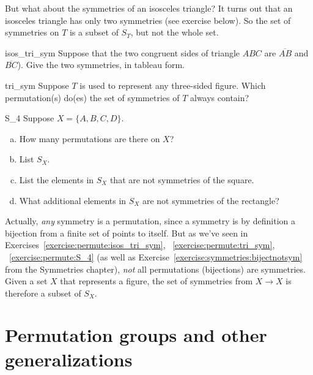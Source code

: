 But what about the symmetries of an isosceles triangle? It turns out that an isosceles triangle has only two symmetries (see exercise below). 
So  the set of symmetries on $T$ is a subset of $S_T$, but not the whole set.

\begin{exercise}{isos_tri_sym}
Suppose that the two congruent sides of triangle $ABC$ are $\overline{AB}$ and $\overline{BC}$). Give the two symmetries, in tableau form.
\end{exercise}

\begin{exercise}{tri_sym}
Suppose $T$ is used to represent any three-sided figure.  
Which permutation(s) do(es) the set of symmetries of $T$ always contain?
\end{exercise}

\begin{exercise}{S_4}
Suppose $X = \{A, B, C, D\}$.
\begin{enumerate}[(a)]
\item
How many permutations are there on $X$?
\item
List $S_X$.
\item
List the elements in $S_X$ that are not symmetries of the square.
\item
What additional elements in $S_X$ are not symmetries of the rectangle?
\end{enumerate}
\end{exercise}

Actually, \emph{any} symmetry is a permutation, since a symmetry is by definition a bijection from a finite set of points to itself.  But as we've seen in Exercises~\ref{exercise:permute:isos_tri_sym}, ~\ref{exercise:permute:tri_sym}, ~\ref{exercise:permute:S_4} (as well as Exercise~\ref{exercise:symmetries:bijectnotsym} from the Symmetries chapter), \emph{not} all permutations (bijections) are symmetries.  Given a set $X$ that represents a figure, the set of symmetries from $X \to X$ is therefore a subset of $S_X$.



\section{Permutation groups and other generalizations}

